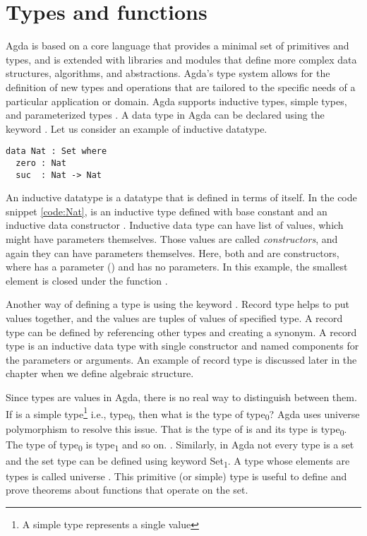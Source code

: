 \section{Types and functions}
Agda is based on a core language that provides a minimal set of primitives and
types, and is extended with libraries and modules that define more complex data
structures, algorithms, and abstractions. Agda's type system allows for the
definition of new types and operations that are tailored to the specific needs
of a particular application or domain. Agda supports inductive types, simple
types, and parameterized types \cite{10.1007/978-3-642-03359-9_6}. A data type
in Agda can be declared using the keyword . Let us consider an
example of inductive datatype.
\label{code:Nat}
\begin{verbatim}
data Nat : Set where
  zero : Nat
  suc  : Nat -> Nat
\end{verbatim}

An inductive datatype is a datatype that is defined in terms of itself. In the
code snippet \ref{code:Nat},  is an inductive type defined with base
constant  and an inductive data constructor . Inductive
data type can have list of values, which might have parameters themselves. Those
values are called \textit{constructors}, and again they can have parameters
themselves. Here, both  and  are constructors, where
 has a parameter () and  has no parameters.
In this example, the smallest element  is closed under the function
. 

Another way of defining a type is using the keyword . Record type
helps to put values together, and the values are tuples of values of specified
type. A record type can be defined by referencing other types and creating a
synonym. A record type is an inductive data type with single constructor and
named components for the parameters or arguments. An example of record type is
discussed later in the chapter when we define algebraic structure.

Since types are values in Agda, there is no real way to distinguish between
them. If  is a simple type\footnote{A simple type represents a
single value} i.e., type\textsubscript{0}, then what is the type of
type\textsubscript{0}? Agda uses universe polymorphism to resolve this issue.
That is the type of  is  and its type is type\textsubscript{0}.
The type of type\textsubscript{0} is type\textsubscript{1} and so on.
\cite{kidney2020finiteness}. Similarly, in Agda not every type is a set and the
set type can be defined using keyword Set\textsubscript{1}. A type whose
elements are types is called universe \cite{universeagda}. This primitive (or
simple) type is useful to define and prove theorems about functions that operate
on the set.

